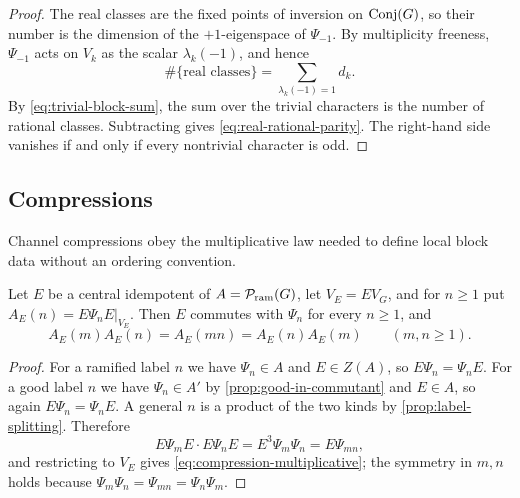 \begin{proof}
The real classes are the fixed points of inversion on
\(\operatorname{Conj}(G)\), so their number is the dimension of the \(+1\)-eigenspace of
\(\Psi_{-1}\).  By multiplicity freeness, \(\Psi_{-1}\) acts on \(V_k\) as
the scalar \(\lambda_k(-1)\), and hence
\[
 \#\{\text{real classes}\}
 =\sum_{\lambda_k(-1)=1}d_k .
\]
By \eqref{eq:trivial-block-sum}, the sum over the trivial characters is the
number of rational classes.  Subtracting gives
\eqref{eq:real-rational-parity}.  The right-hand side vanishes if and only
if every nontrivial character is odd.
\end{proof}

\subsection{Compressions}

Channel compressions obey the multiplicative law needed to define local
block data without an ordering convention.

\begin{proposition}
\label{prop:compression-multiplicative}
Let \(E\) be a central idempotent of \(A=\mathcal P_{\mathrm{ram}}(G)\), let \(V_E=EV_G\), and
for \(n\geq1\) put \(A_E(n)=E\Psi_nE|_{V_E}\).  Then \(E\) commutes with
\(\Psi_n\) for every \(n\geq1\), and
\begin{equation}
 A_E(m)A_E(n)=A_E(mn)=A_E(n)A_E(m)
 \qquad(m,n\geq1).
 \label{eq:compression-multiplicative}
\end{equation}
\end{proposition}

\begin{proof}
For a ramified label \(n\) we have \(\Psi_n\in A\) and \(E\in Z(A)\), so
\(E\Psi_n=\Psi_nE\).  For a good label \(n\) we have \(\Psi_n\in A'\) by
\cref{prop:good-in-commutant} and \(E\in A\), so again
\(E\Psi_n=\Psi_nE\).  A general \(n\) is a product of the two kinds by
\cref{prop:label-splitting}.  Therefore
\[
 E\Psi_mE\cdot E\Psi_nE=E^3\Psi_m\Psi_n=E\Psi_{mn},
\]
and restricting to \(V_E\) gives \eqref{eq:compression-multiplicative}; the
symmetry in \(m,n\) holds because \(\Psi_m\Psi_n=\Psi_{mn}=\Psi_n\Psi_m\).
\end{proof}
